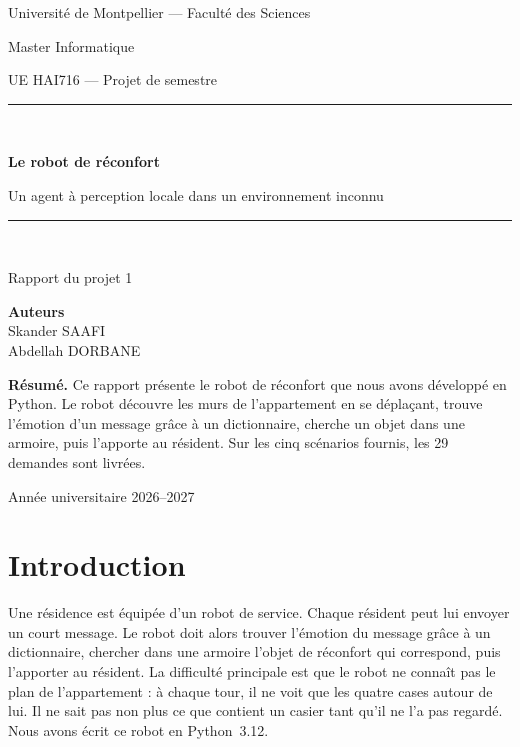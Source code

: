 \documentclass[11pt,a4paper]{article}
\begin{document}
\begin{titlepage}
\centering
{\large Université de Montpellier --- Faculté des Sciences\par}
{\large Master Informatique\par}
\vspace{0.3cm}
{\normalsize UE HAI716 --- Projet de semestre\par}
\vspace{3cm}
\rule{\linewidth}{0.8pt}\\[0.5cm]
{\LARGE\bfseries Le robot de réconfort\par}
\vspace{0.3cm}
{\Large Un agent à perception locale dans un environnement inconnu\par}
\vspace{0.3cm}
\rule{\linewidth}{0.8pt}\\[0.4cm]
{\large Rapport du projet 1\par}
\vspace{2.5cm}
{\large\textbf{Auteurs}\\[0.2cm]
Skander SAAFI\\
Abdellah DORBANE\par}
\vspace{2.5cm}
\begin{minipage}{0.85\linewidth}
\small
\textbf{Résumé.} Ce rapport présente le robot de réconfort que nous avons développé en Python. Le robot découvre les murs de l'appartement en se déplaçant, trouve l'émotion d'un message grâce à un dictionnaire, cherche un objet dans une armoire, puis l'apporte au résident. Sur les cinq scénarios fournis, les 29 demandes sont livrées.
\end{minipage}
\vfill
{\large Année universitaire 2026--2027\par}
\end{titlepage}

\section{Introduction}

Une résidence est équipée d'un robot de service. Chaque résident peut lui envoyer un court message. Le robot doit alors trouver l'émotion du message grâce à un dictionnaire, chercher dans une armoire l'objet de réconfort qui correspond, puis l'apporter au résident. La difficulté principale est que le robot ne connaît pas le plan de l'appartement : à chaque tour, il ne voit que les quatre cases autour de lui. Il ne sait pas non plus ce que contient un casier tant qu'il ne l'a pas regardé. Nous avons écrit ce robot en Python~3.12.
\end{document}
